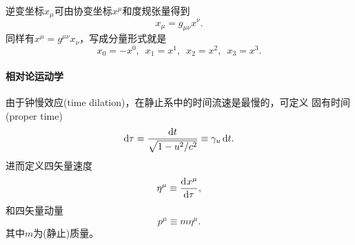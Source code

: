 逆变坐标$x_\mu$可由协变坐标$x^\mu$和度规张量得到
\begin{equation}
    x_\mu=g_{\mu\nu}x^\nu.
\end{equation}
同样有$x^\mu=g^{\mu\nu}x_\nu$，写成分量形式就是
\[
    x_0=-x^0,\enspace x_1=x^1,\enspace x_2=x^2,\enspace x_3=x^3.
\]

\paragraph{相对论运动学}

由于钟慢效应(time dilation)，在静止系中的时间流速是最慢的，可定义
固有时间(proper time)
\[
    \mathop{}\!\mathrm{d}\tau=\frac{\mathop{}\!\mathrm{d} t}{\sqrt{1-u^2/c^2}}\equiv\gamma_u\mathop{}\!\mathrm{d} t.
\]
进而定义四矢量速度
\begin{equation}
    \eta^\mu\equiv\frac{\mathrm{d}^{{}}x^\mu}{\mathrm{d}{\tau}^{{}}},
\end{equation}
和四矢量动量
\begin{equation}
    p^\mu\equiv m\eta^\mu.
\end{equation}
其中$m$为(静止)质量。

